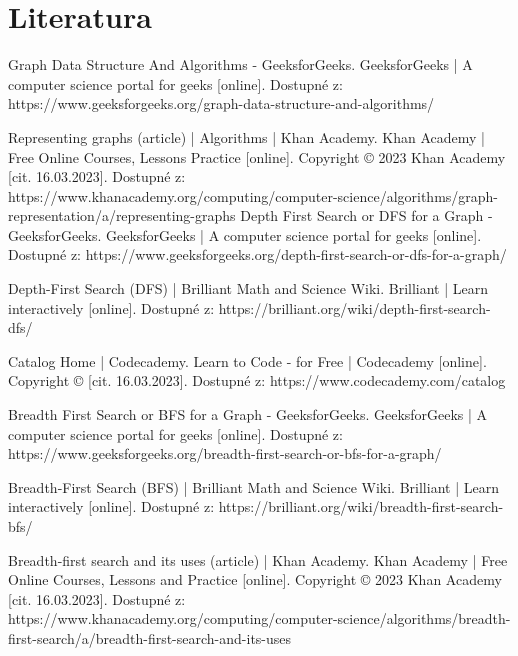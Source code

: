 \documentclass[12pt]{article}
\begin{document}
\section{Literatura}
\begin{thebibliography}{9}
    Graph Data Structure And Algorithms - GeeksforGeeks. GeeksforGeeks | A computer science 
    portal for geeks [online]. Dostupné z: https://www.geeksforgeeks.org/graph-data-structure-and-algorithms/

    Representing graphs (article) | Algorithms | Khan Academy. Khan Academy | Free Online Courses, 
    Lessons Practice [online]. Copyright © 2023 Khan Academy [cit. 16.03.2023]. Dostupné z: https://www.khanacademy.org/computing/computer-science/algorithms/graph-representation/a/representing-graphs
    Depth First Search or DFS for a Graph - GeeksforGeeks. GeeksforGeeks | A computer science portal for geeks [online]. Dostupné z: https://www.geeksforgeeks.org/depth-first-search-or-dfs-for-a-graph/

    
    Depth-First Search (DFS) | Brilliant Math and Science Wiki. Brilliant | Learn interactively [online]. Dostupné z: https://brilliant.org/wiki/depth-first-search-dfs/

    Catalog Home | Codecademy. Learn to Code - for Free | Codecademy [online]. Copyright © [cit. 16.03.2023]. Dostupné z: https://www.codecademy.com/catalog

    Breadth First Search or BFS for a Graph - GeeksforGeeks. GeeksforGeeks | A computer science portal for geeks [online]. Dostupné z: https://www.geeksforgeeks.org/breadth-first-search-or-bfs-for-a-graph/

    Breadth-First Search (BFS) | Brilliant Math and Science Wiki. Brilliant | Learn interactively [online]. Dostupné z: https://brilliant.org/wiki/breadth-first-search-bfs/

    Breadth-first search and its uses (article) | Khan Academy. Khan Academy | Free Online Courses, Lessons and Practice [online]. Copyright © 2023 Khan Academy [cit. 16.03.2023]. Dostupné z: https://www.khanacademy.org/computing/computer-science/algorithms/breadth-first-search/a/breadth-first-search-and-its-uses
\end{thebibliography}
\end{document}
